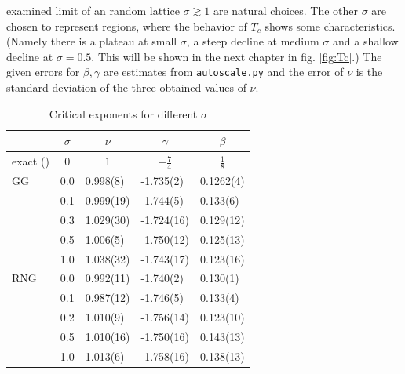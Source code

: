     examined limit of an random lattice \(\sigma \gtrsim 1\) are natural
    choices.
    The other \(\sigma\) are chosen to represent regions, where the behavior of
    \(T_c\) shows some characteristics. (Namely there is a plateau at small
    \(\sigma\), a steep decline at medium \(\sigma\) and a shallow
    decline at \(\sigma = 0.5\). This will be shown in the next
    chapter in fig. \ref{fig:Tc}.)
    The given errors for \(\beta, \gamma\) are estimates from \texttt{autoscale.py}
    and the error of \(\nu\) is the standard deviation of the three obtained
    values of \(\nu\).\\
    \begin{table}[htbp]
        \center
        \begin{tabular}{l l l l l}
            \toprule
             & \multicolumn{1}{c}{\(\sigma\)} & \multicolumn{1}{c}{\(\nu\)} & \multicolumn{1}{c}{\(\gamma\)} & \multicolumn{1}{c}{\(\beta\)}\\
            \midrule
            exact (\cite[p. 59]{Pelissetto2002}) & \multicolumn{1}{c}{\(0\)} & \multicolumn{1}{c}{\(1\)} & \multicolumn{1}{c}{\(-\frac{7}{4}\)} & \multicolumn{1}{c}{\(\frac{1}{8}\)}\\
            \midrule
            GG           & 0.0 & 0.998(8) & -1.735(2) & 0.1262(4)\\
                         & 0.1 & 0.999(19)& -1.744(5) & 0.133(6) \\
                         & 0.3 & 1.029(30)& -1.724(16)& 0.129(12)\\
                         & 0.5 & 1.006(5) & -1.750(12)& 0.125(13)\\
                         & 1.0 & 1.038(32)& -1.743(17)& 0.123(16)\\
            \midrule
            RNG          & 0.0 & 0.992(11)& -1.740(2) & 0.130(1) \\
                         & 0.1 & 0.987(12)& -1.746(5) & 0.133(4) \\
                         & 0.2 & 1.010(9) & -1.756(14)& 0.123(10)\\
                         & 0.5 & 1.010(16)& -1.750(16)& 0.143(13)\\
                         & 1.0 & 1.013(6) & -1.758(16)& 0.138(13)\\
            \bottomrule
        \end{tabular}
        \caption{Critical exponents for different $\sigma$}
        \label{tab:critExp}
    \end{table}\\
